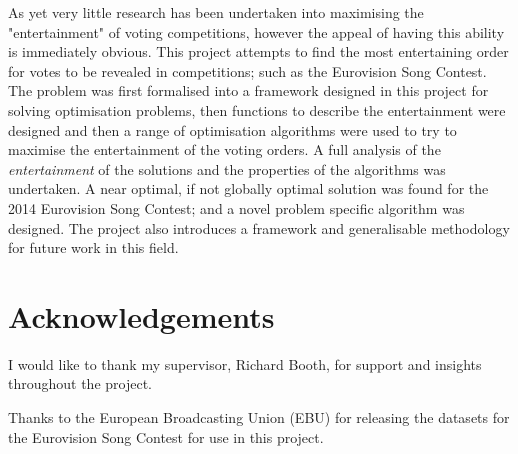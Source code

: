 \documentclass[12pt]{report}
\begin{document}
As yet very little research has been undertaken into maximising the "entertainment" of voting competitions, however the appeal of having this ability is immediately obvious. This project attempts to find the most entertaining order for votes to be revealed in competitions; such as the Eurovision Song Contest. The problem was first formalised into a framework designed in this project for solving optimisation problems, then functions to describe the entertainment were designed and then a range of optimisation algorithms were used to try to maximise the entertainment of the voting orders. A full analysis of the \textit{entertainment} of the solutions and the properties of the algorithms was undertaken. A near optimal, if not globally optimal solution was found for the 2014 Eurovision Song Contest; and a novel problem specific algorithm was designed. The project also introduces a framework and generalisable methodology for future work in this field.

\section*{Acknowledgements}
I would like to thank my supervisor, Richard Booth, for support and insights throughout the project.

Thanks to the European Broadcasting Union (EBU) for releasing the datasets for the Eurovision Song Contest for use in this project.

\tableofcontents %
\listoffigures
\listoftables
\clearpage %

\end{document}

